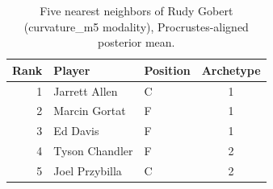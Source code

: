 \begin{table}[htbp]
  \centering\small
  \begin{tabular}{rllc}
    \toprule
    Rank & Player & Position & Archetype \\
    \midrule
    1 & Jarrett Allen & C & 1 \\
    2 & Marcin Gortat & F & 1 \\
    3 & Ed Davis & F & 1 \\
    4 & Tyson Chandler & F & 2 \\
    5 & Joel Przybilla & C & 2 \\
    \bottomrule
  \end{tabular}
  \caption{Five nearest neighbors of Rudy Gobert (curvature_m5 modality), Procrustes-aligned posterior mean.}
  \label{tab:Rudy_Gobert_neighbors_curvature_m5}
\end{table}

